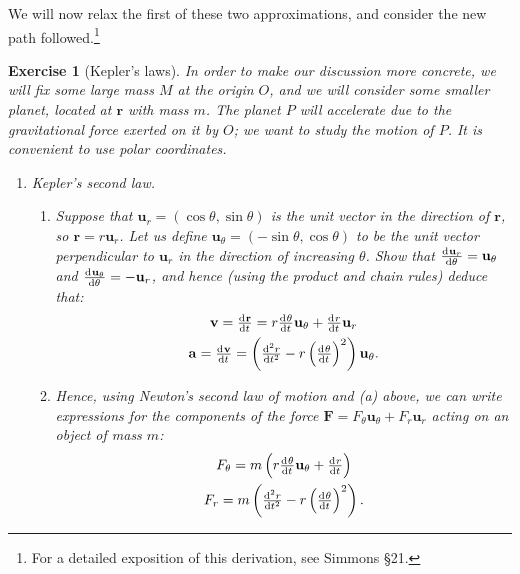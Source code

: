 \documentclass[a4paper,leqno,10pt]{article}
\theoremstyle{exercise}
\newtheorem{Exercise}{Exercise}
\newenvironment{exercise}
  {\begin{mdframed}\begin{Exercise}}
  {\end{Exercise}\end{mdframed}}
\theoremstyle{plain}
\theoremstyle{definition}
\theoremstyle{remark}
\renewcommand\vec{\mathbf}
\begin{document}
We will now relax the first of these two approximations, and consider the new path followed.\footnote{For a detailed
exposition of this derivation, see Simmons \S21.}
\begin{exercise}[Kepler's laws]
  In order to make our discussion more concrete, we will fix some large mass $ M $ at the origin $ O $, and we
  will consider some smaller planet, located at $ \vec{r} $ with mass $ m $. The planet $ P $ will accelerate due to
  the gravitational force exerted on it by $ O $; we want to study the motion of $ P $. It is convenient to use
  polar coordinates.

  \begin{enumerate}
    \item Kepler's second law.
      \begin{enumerate}
        \item Suppose that $ \vec{u}_r = (\cos \theta, \sin \theta) $ is the unit vector in the direction of $ \vec{r} $, so $ \vec{r} = r\vec{u}_r $.
              Let us define $ \vec{u}_\theta = (-\sin\theta, \cos \theta) $ to be the unit vector perpendicular to $ \vec{u}_r $ in the direction
              of increasing $ \theta $. Show that $ \od{\vec{u}_r}{\theta} = \vec{u}_\theta $ and $ \od{\vec{u}_\theta}{\theta} = -\vec{u}_r $, and hence (using
              the product and chain rules) deduce that:
              \begin{gather*}
                \vec{v} = \od{\vec{r}}{t} = r \od{\theta}{t} \vec{u}_\theta + \od{r}{t} \vec{u}_r\\
                \vec{a} = \od{\vec{v}}{t} = \left( \od[2]{r}{t} - r \left(\od{\theta}{t}\right)^2 \right)\vec{u}_\theta.
              \end{gather*}
        \item Hence, using Newton's second law of motion and (a) above, we can write expressions for the components of the
              force $ \vec{F} = F_\theta \vec{u}_\theta + F_r \vec{u}_r $ acting on an object of mass $ m $:
              \begin{gather*}
                F_\theta = m\left(r \od{\theta}{t} \vec{u}_\theta + \od{r}{t} \right)\\
                F_r = m\left( \od[2]{r}{t} - r \left(\od{\theta}{t}\right)^2 \right).
              \end{gather*}


\end{enumerate}
\end{enumerate}
\end{exercise}
\end{document}
